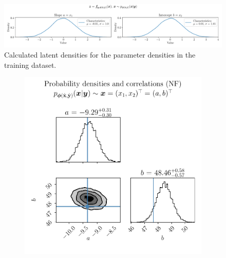 \documentclass[a4paper,12pt]{report}
\begin{document}
\begin{figure}[h!]
\centering
\includegraphics[width=\textwidth]{figures/nf-linear-regression-example-calcbasedensities.pdf}
\caption{Calculated latent densities for the parameter densities in the training dataset.}
\label{fig:nf-linear-regression-example-calcbasedensities}
\end{figure}

\begin{figure}[h!]
	\centering
	\begin{subfigure}[t]{0.49\textwidth}
	\centering
	\includegraphics[width=\textwidth]{figures/nf-linear-regression-example-corner.pdf}
	\end{subfigure}
	\hfill
	\begin{subfigure}[t]{0.49\textwidth}
	\centering

\end{subfigure}
\end{figure}
\end{document}
